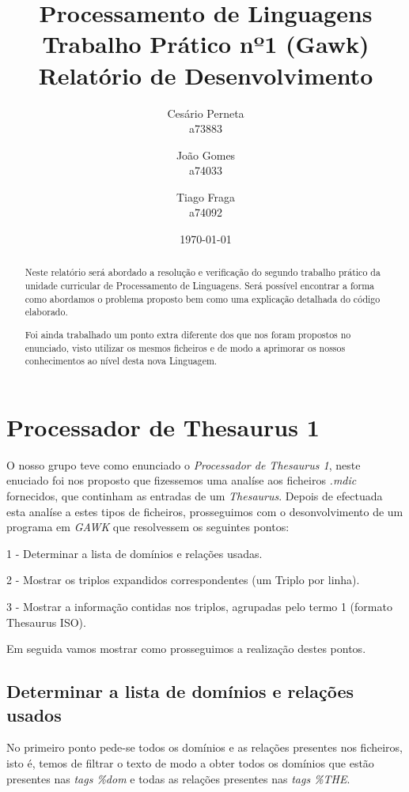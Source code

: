 \documentclass{report}
\title{Processamento de Linguagens\\ \textbf{Trabalho Prático nº1 (Gawk)}\\ Relatório de Desenvolvimento}
\author{Cesário Perneta\\ a73883 \and João Gomes\\ a74033 \and Tiago Fraga\\ a74092}
\date{\today}
\def\titulo#1{\section{#1}}
\begin{document}

\maketitle

\begin{abstract}
    Neste relatório será abordado a resolução e verificação do segundo trabalho prático da unidade curricular de Processamento de Linguagens. Será possível encontrar a forma como abordamos o problema proposto bem como uma explicação detalhada do código elaborado.
    
    Foi ainda trabalhado um ponto extra diferente dos que nos foram propostos no enunciado, visto utilizar os mesmos ficheiros e de modo a aprimorar os nossos conhecimentos ao nível desta nova Linguagem.
\end{abstract}

\tableofcontents

\chapter{ Processador de Thesaurus 1} \label{intro}
    
    O nosso grupo teve como enunciado o \textit{Processador de Thesaurus 1}, neste enuciado foi nos proposto que fizessemos uma analíse aos ficheiros \textit{.mdic} fornecidos, que continham as entradas de um \textit{Thesaurus}.
    Depois de efectuada esta analíse a estes tipos de ficheiros, prosseguimos com o desonvolvimento de um programa em \textit{GAWK} que resolvessem os seguintes pontos:
        
        1 - Determinar a lista de domínios e relações usadas.
        
        2 - Mostrar os triplos expandidos correspondentes (um Triplo por linha).
        
        3 - Mostrar a informação contidas nos triplos, agrupadas pelo termo 1 (formato Thesaurus ISO).

    Em seguida vamos mostrar como prosseguimos a realização destes pontos. 

\titulo{ Determinar a lista de domínios e relações usados }

    No primeiro ponto pede-se todos os domínios e as relações presentes nos ficheiros, isto é, temos de filtrar o texto de modo a obter todos os domínios que estão presentes nas \textit{tags \%dom} e todas as relações presentes nas \textit{tags \%THE}.
\end{document}
